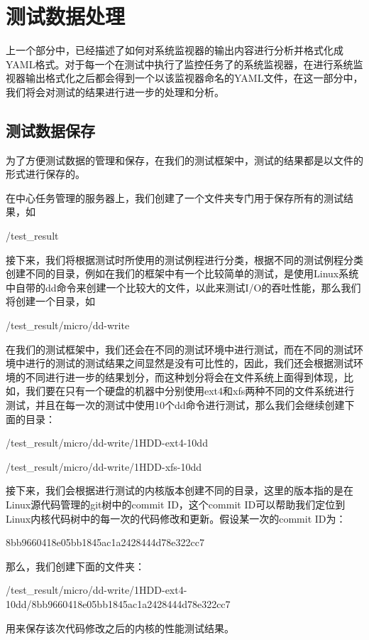 \section{测试数据处理}

上一个部分中，已经描述了如何对系统监视器的输出内容进行分析并格式化成YAML格式。对于每一个在测试中执行了监控任务了的系统监视器，在进行系统监视器输出格式化之后都会得到一个以该监视器命名的YAML文件，在这一部分中，我们将会对测试的结果进行进一步的处理和分析。

\subsection{测试数据保存}

为了方便测试数据的管理和保存，在我们的测试框架中，测试的结果都是以文件的形式进行保存的。

在中心任务管理的服务器上，我们创建了一个文件夹专门用于保存所有的测试结果，如
\begin{center}
/test\_result
\end{center}
接下来，我们将根据测试时所使用的测试例程进行分类，根据不同的测试例程分类创建不同的目录，例如在我们的框架中有一个比较简单的测试，是使用Linux系统中自带的dd命令来创建一个比较大的文件，以此来测试I/O的吞吐性能，那么我们将创建一个目录，如
\begin{center}
/test\_result/micro/dd-write
\end{center}

在我们的测试框架中，我们还会在不同的测试环境中进行测试，而在不同的测试环境中进行的测试的测试结果之间显然是没有可比性的，因此，我们还会根据测试环境的不同进行进一步的结果划分，而这种划分将会在文件系统上面得到体现，比如，我们要在只有一个硬盘的机器中分别使用ext4和xfs两种不同的文件系统进行测试，并且在每一次的测试中使用10个dd命令进行测试，那么我们会继续创建下面的目录：
\begin{center}
/test\_result/micro/dd-write/1HDD-ext4-10dd

/test\_result/micro/dd-write/1HDD-xfs-10dd
\end{center}

接下来，我们会根据进行测试的内核版本创建不同的目录，这里的版本指的是在Linux源代码管理的git树中的commit ID，这个commit ID可以帮助我们定位到Linux内核代码树中的每一次的代码修改和更新。假设某一次的commit ID为：
\begin{center}
8bb9660418e05bb1845ac1a2428444d78e322cc7
\end{center}
那么，我们创建下面的文件夹：
\begin{center}
\footnotesize
/test\_result/micro/dd-write/1HDD-ext4-10dd/8bb9660418e05bb1845ac1a2428444d78e322cc7
\end{center}
用来保存该次代码修改之后的内核的性能测试结果。

